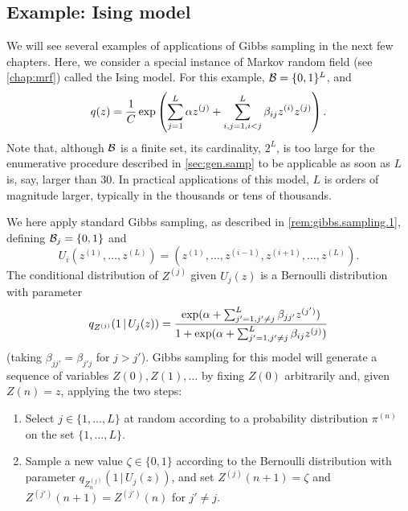 \subsection{Example: Ising model}
\label{sec:gibbs.ising}
We will see  several examples of applications of Gibbs sampling in the next few chapters. Here, we consider a special instance of Markov random field (see \cref{chap:mrf}) called the Ising model. For this example,  ${\mathcal B} = \{0,1\}^L$, and
\[
q(z) = \frac1{C} \exp\left( \sum_{j=1}^L \alpha z^{(j)} + \sum_{i,j=1, i< j}^L \beta_{ij} z^{(i)} z^{(j)}\right).
\]
Note that, although ${\mathcal B}$ is a finite set, its cardinality, $2^L$, is too large for the enumerative procedure described in \cref{sec:gen.samp} to be applicable as soon as $L$ is, say, larger than 30. In practical applications of this model, $L$ is orders of magnitude larger, typically in the thousands or tens of thousands.

We here apply standard Gibbs sampling, as described in \cref{rem:gibbs.sampling.1}, defining ${\mathcal B}_j = \{0,1\}$ and 
\[
U_i(z^{(1)}, \ldots, z^{(L)}) =  (z^{(1)}, \ldots, z^{(i-1)}, z^{(i+1)}, \ldots, z^{(L)}).
\]
 The conditional distribution of $Z^{(j)}$ given $U_j(z)$ is a Bernoulli distribution with parameter
\[
q_{Z^{(j)}}(1\,|\,U_j(z)) = \frac{\exp(\alpha + \sum_{j'=1, j'\neq j}^L \beta_{jj'} z^{(j')})}{1 + \exp(\alpha + \sum_{j'=1, j'\neq j}^L \beta_{ij} z^{(j)})}
\]
(taking  $\beta_{jj'} = \beta_{j'j}$ for $j>j'$).  
Gibbs sampling for this model will generate a sequence of variables $Z(0), Z(1), \ldots$ by fixing $Z(0)$ arbitrarily and, given $Z(n) = z$, applying the two steps:
\begin{enumerate}[label=\arabic*., wide=0.5cm]
    \item Select $j\in \{1, \ldots, L\}$  at random according to a probability distribution $\pi^{(n)}$ on the set $\{1, \ldots, L\}$. 
    \item Sample a new value $\zeta\in \{0,1\}$ according to the Bernoulli distribution with parameter $q_{Z_n^{(j)}}(1\,|\,U_j(z))$, and set $Z^{(j)}(n+1) = \zeta$ and $Z^{(j')}(n+1) = Z^{(j')}(n)$ for $j'\neq j$.
\end{enumerate}

